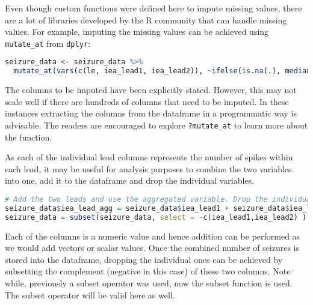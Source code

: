 Even though custom functions were defined here to impute missing values, there are a lot of libraries developed by the R community that can handle missing values. For example, imputing the missing values can be achieved using \verb|mutate_at| from \verb|dplyr|:
\begin{lstlisting}[language=R]
seizure_data <- seizure_data %>%
  mutate_at(vars(c(le, iea_lead1, iea_lead2)), ~ifelse(is.na(.), median(., na.rm = TRUE), .))
\end{lstlisting}
The columns to be imputed have been explicitly stated. However, this may not scale well if there are hundreds of columns that need to be imputed. In these instances extracting the columns from the dataframe in a programmatic way is advisable. The readers are encouraged to explore \verb|?mutate_at| to learn more about the function.

As each of the individual lead columns represents the number of spikes within each lead, it may be useful for analysis purposes to combine the two variables into one, add it to the dataframe and drop the individual variables.
\begin{lstlisting}[language=R]
# Add the two leads and use the aggregated variable. Drop the individual ones
seizure_data$iea_lead_agg = seizure_data$iea_lead1 + seizure_data$iea_lead2
seizure_data = subset(seizure_data, select = -c(iea_lead1,iea_lead2) )
\end{lstlisting}
Each of the columns is a numeric value and hence addition can be performed as we would add vectors or scalar values. Once the combined number of seizures is stored into the dataframe, dropping the individual ones can be achieved by subsetting the complement (negative in this case) of these two columns. Note while, previously a subset operator was used, now the subset function is used. The subset operator will be valid here as well.


